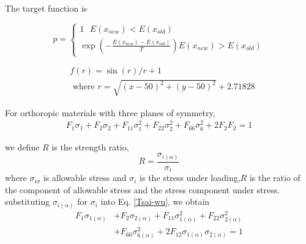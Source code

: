 \documentclass[smallextended]{svjour3}       %
\begin{document}

The target function is 


\begin{equation}
p=\left\{
    \begin{array}{c}{1}  
        \text{      }   E\left(x_{n e w}\right)<E\left(x_{o l d}\right)
        \\ 
{\exp \left(-\frac{E\left(x_{new}\right)-E\left(x_{old}\right)}{T}\right)}
                        E\left(x_{n e w}\right)>E\left(x_{o l d}\right)
\end{array}\right.
\end{equation}


\begin{equation*}
    \begin{split}
        &f(r)=\sin(r)/r + 1  \\
             &\text{ where  } r=\sqrt{(x-50)^2+(y-50)^2}+2.71828
    \end{split}
\end{equation*}



For orthoropic materials with three planes of symmetry, 
\begin{equation}\label{Tsai-wu}
	\begin{split}
		F_1\sigma_1+F_2\sigma_2+F_{11}\sigma_1^2+F_{22}\sigma_2^2+F_{66}\sigma_6^2+2F_2F_2=1
    \end{split}
\end{equation}

we define $R$ is the strength ratio,
\begin{equation}\label{strength-ratio}
    R=\frac{\sigma_{i(\alpha)}}{\sigma_i}
\end{equation}
where $\sigma_{i{\sigma}}$ is allowable stress and $\sigma_i$ is the stress under loading,$R$ is
the ratio of the component of allowable stress and the stress component under stress.
substituting $\sigma_{i(\alpha)}$ for $\sigma_i$ into Eq. \ref{Tsai-wu}, we obtain
\begin{equation}
	\begin{split}
		F_1\sigma_{1(\alpha)}&+F_2\sigma_{2(\alpha)}+F_{11}\sigma_{1(\alpha)}^2+F_{22}\sigma_{2(\alpha)}^2 \\
						&+F_{66}\sigma_{6(\alpha)}^2+2F_{12}\sigma_{1(\alpha)}\sigma_{2(\alpha)}=1
    \end{split}
\end{equation}
\end{document}

